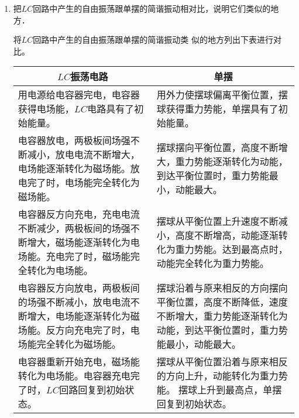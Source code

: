 \begin{enumerate}
	\item 把$LC$回路中产生的自由振荡跟单摆的简谐振动相对比，说明它们类似的地方．

    \begin{solution}
将$LC$回路中产生的自由振荡跟单摆的简谐振动类
似的地方列出下表进行对比。
\begin{center}
\begin{tabular}{p{}p{}}
\hline

\multicolumn{1}{c}{$LC$振荡电路}& \multicolumn{1}{c}{单摆}\\
\hline
用电源给电容器完电，电容器获得电场能，$LC$电路具有了初始能量。
 &用外力使摆球偏离平衡位置，摆球获得重力势能，单摆具有了初始能量。\\\hline
 电容器放电，两极板间场强不断减小，放电电流不断增大，电场能逐渐转化为磁场能。放电完了时，电场能完全转化为磁场能。
&摆球摆向平衡位置，高度不断增大，重力势能逐渐转化为动能，到达平衡位置时，重力势能最小，动能最大。\\\hline
电容器反方向充电，充电电流不断减少，两极板间的场强不断增大，磁场能逐渐转化为电场能。充电完了时，磁场能完全转化为电场能。
&摆球从平衡位置上升速度不断减小，高度不断增高，动能逐渐转化为重力势能。达到最高点时，动能完全转化为重力势能。\\\hline
电容器反方向放电，两极板间的场强不断减小，放电电流不断增大，电场能逐渐转化为磁场能。反方向充电完了时，电场能完全转化为磁场能。
& 摆球沿着与原来相反的方向摆向平衡位置，高度不断降低，速度不断增大，重力势能逐渐转化为动能，到达平衡位置时，重力势能最小，动能最大。\\\hline
电容器重新开始充电，磁场能转化为电场能。电容器充电完了时，$LC$回路回复到初始状态。
&摆球从平衡位置沿着与原来相反的方向上升，动能转化为重力势能。
摆球上升到最高点，单摆回复到初始状态。\\
\hline
\end{tabular}
\end{center}
    \end{solution}
\end{enumerate}



